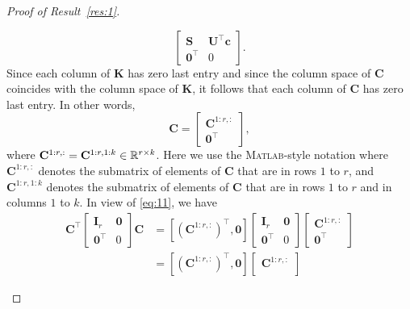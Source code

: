 \documentclass[11pt,a4paper]{article}
\theoremstyle{break}
\numberwithin{dummy}{section}
\theoremstyle{plain}
\theoremstyle{plain}
\theoremstyle{plain}
\theoremstyle{plain}
\theoremstyle{plain}
\theoremstyle{MyNonumberplain}
\newtheorem{proof}{Proof}
\newcommand{\0}{\M{0}}
\newcommand{\M}[1]{\mathbf{#1}}
\newcommand{\R}{\mathbb{R}}
\newcommand{\T}{\top}
\newcommand{\ve}[1]{\mathbf{#1}}
\newcommand{\Mat}[2]{%
  \ifthenelse{\equal{#2}{1}}
  {\R^{#1}}
  {\R^{#1 \times #2}}
}
\begin{document}
\begin{proof}[Proof of Result~\ref{res:1}]
\begin{enumerate}[font=\upshape,label=(\roman*),wide,align=right]
\begin{displaymath}
\begin{bmatrix}
        \M{S} & \M{U}^\T \ve{c} \\
        \0^\T & 0
      \end{bmatrix}.
    \end{displaymath}
    Since each column of $\M{K}$ has zero last entry and since the column space of $\M{C}$ coincides with the column space of $\M{K}$, it follows that each column of $\M{C}$ has zero last entry. In other words,
    \begin{equation}
      \label{eq:11}
      \M{C} =
      \begin{bmatrix}
        \M{C}^{1:r, :}
        \\
        \0^\T
      \end{bmatrix},
    \end{equation}
    where $\M{C}^{1:r, :} = \M{C}^{1:r,1:k} \in \Mat{r}{k}$.  Here we use the \textsc{Matlab}-style notation where $\M{C}^{1:r, :}$ denotes the submatrix of elements of $\M{C}$ that are in rows $1$ to $r$, and $\M{C}^{1:r,1:k}$ denotes the submatrix of elements of $\M{C}$ that are in rows $1$ to $r$ and in columns $1$ to $k$.
    In view of \eqref{eq:11}, we have
    \begin{align*}
      \M{C}^\T
      \begin{bmatrix}
        \M{I}_r & \0 \\
        \0^\T & 0
      \end{bmatrix}
                \M{C} & =
                        [(\M{C}^{1:r, :})^\T, \0]
                        \begin{bmatrix}
                          \M{I}_r & \0 \\
                          \0^\T & 0
                        \end{bmatrix}
                                  \begin{bmatrix}
                                    \M{C}^{1:r,:}
                                    \\
                                    \0^\T
                                  \end{bmatrix}
      \\ & =
           [(\M{C}^{1:r, :})^\T, \0]
           \begin{bmatrix}
             \M{C}^{1:r,:}
             \\

\end{bmatrix}
\end{align*}
\end{enumerate}
\end{proof}
\end{document}
